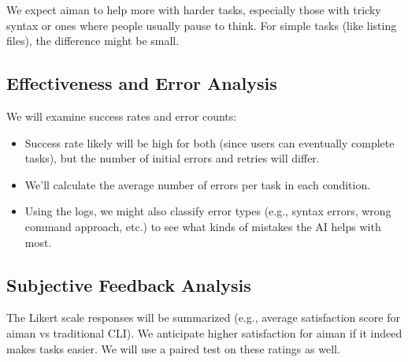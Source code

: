 We expect aiman to help more with harder tasks, especially those with tricky syntax or ones where people usually pause to think. For simple tasks (like listing files), the difference might be small.

\subsection{Effectiveness and Error Analysis}

We will examine success rates and error counts:
\begin{itemize}
	\item Success rate likely will be high for both (since users can eventually complete tasks), but the number of initial errors and retries will differ.
	\item We'll calculate the average number of errors per task in each condition.
	\item Using the logs, we might also classify error types (e.g., syntax errors, wrong command approach, etc.) to see what kinds of mistakes the AI helps with most.
\end{itemize}



\subsection{Subjective Feedback Analysis}

The Likert scale responses will be summarized (e.g., average satisfaction score for aiman vs traditional CLI). We anticipate higher satisfaction for aiman if it indeed makes tasks easier. We will use a paired test on these ratings as well.
